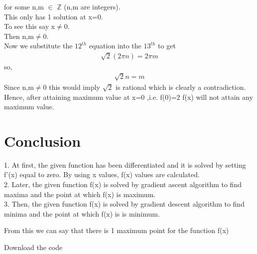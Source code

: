 \documentclass[10pt,a4paper]{report}
\begin{document}
\begin{multicols}{2}
for some n,m $\in$ $\mathbb{Z}$  (n,m are integers).
\vspace{0.25cm}\\
This only has 1 solution at x=0. 
\vspace{0.25cm}\\
 To see this say x$\neq$0. 
 \vspace{0.25cm}\\
 Then n,m$\neq$0.
 \vspace{0.25cm}\\
 Now we substitute the $12^{th}$ equation into the $13^{th}$ to get
 \begin{align}
 \sqrt{2}(2\pi n)=2\pi m
\end{align} 
 so,
 \begin{align}
 \sqrt{2} n= m
\end{align} 
Since n,m$\neq$0 this would imply $
\sqrt{2}$ is rational which is clearly a contradiction.
\vspace{0.25cm}\\
Hence, after attaining maximum value at x=0 ,i.e. f(0)=2
f(x) will not attain any maximum value.
 \section*{Conclusion}
\begin{flushleft}
1. At first, the given function has been differentiated and it is solved by setting f'(x) equal to zero. By using x values, f(x) values are calculated.\\
\vspace{0.25cm}
2. Later, the given function f(x) is solved by gradient ascent algorithm to find maxima and the point at which f(x) is maximum.\\
\vspace{0.25cm}
3. Then, the given function f(x) is solved by gradient descent algorithm to find minima and the point at which f(x) is is minimum.\\
\vspace{0.25cm}
\end{flushleft} 
 From this we can say that there is 1 maximum point for the function f(x)
\raggedright  Download the code 
\vspace{0.25cm}\\
\vspace{0.2cm}\\ 

    
  \end{multicols}
\end{document}
